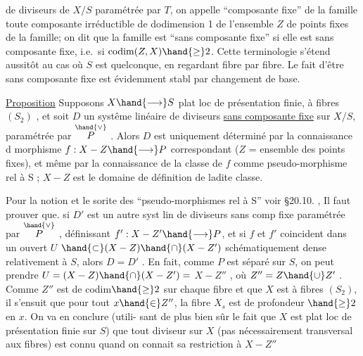 
de diviseurs de $X/S$ paramétrée par $T$, on appelle ``composante fixe'' de la
famille toute composante irréductible de dodimension 1 de l'ensemble $Z$ de
points fixes de la famille; on dit que la famille est ``sans composante
fixe'' si elle est sans composante fixe, i.e.\ si $\operatorname{codim}(Z,X) \hand{\geq} 2$. Cette
terminologie s'étend aussitôt au cas où $S$ est quelconque, en regardant
fibre par fibre. Le fait d'être sans composante fixe est évidemment stabl
par changement de base.

\uline{Proposition} \hand{/}Supposons $X \hand{\longrightarrow} S$ plat loc de présentation finie, à fibres
$(S_2)$ , et soit $D$ un systême linéaire de diviseurs \uline{sans composante fixe}
sur $X/S$, paramétrée par $\overset{\hand{\vee}}{P}$ . Alors $D$ est uniquement déterminé par la
connaissance d morphisme $f: X - Z \hand{\longrightarrow} P$ correspondant ($Z$ = ensemble
des points fixes), et même par la connaissance de la classe de $f$ comme
pseudo-morphisme rel à S ; $X-Z$ est le domaine
de définition de ladite classe.

Pour la notion et le sorite des ``pseudo-morphismes
rel à S'' voir \S 20.10. ,  Il faut prouver que.
si  $D'$ est un
autre syst lin de diviseurs sans comp fixe paramétrée par $\overset{\hand{\vee}}{P}$ , 
définissant $f': X-Z' \hand{\longrightarrow} P$, et si $f$ et $f'$ coincident dans un ouvert $U$
$\hand{\subset} (X-Z)\hand{\cap}(X-Z')$ schématiquement dense relativement à $S$, alors $D=D'$ .
En fait, comme $P$ est séparé sur $S$, on peut prendre $U=(X-Z)\hand{\cap}(X-Z') =$
 $X-Z''$ , où $Z'' = Z\hand{\cup}Z'$ . Comme $Z''$ est de codim$\hand{\geq}2$
sur chaque fibre et que $X$ est à fibres $(S_2)$, il s'ensuit que pour tout
$x\hand{\in} Z''$, la fibre $X_s$ est de profondeur $\hand{\geq}2$ en $x$. On va en conclure (utili-%
sant de plus bien sûr le fait que $X$ est plat loc de présentation finie
sur $S$) que tout diviseur  sur $X$ (pas nécessairement 
transversal aux fibres) est connu quand on connait sa restriction à $X-Z''$

